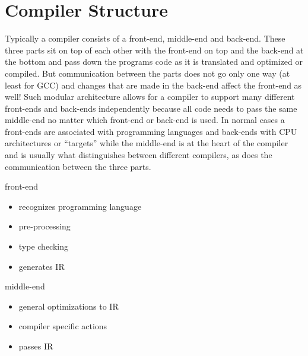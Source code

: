 \chapter{Compiler Structure}
\label{chapter:compiler structure}
Typically a compiler consists of a front-end, middle-end and back-end. These three parts sit on top of each other with the front-end on top and the back-end at the bottom and pass down the programs code as it is translated and optimized or compiled. But communication between the parts does not go only one way (at least for GCC)
and changes that are made in the back-end affect the front-end as well!
Such modular architecture  allows for a compiler to support many different front-ends and back-ends independently because all code needs to pass the same middle-end no matter which front-end or back-end is used. In normal cases a front-ends are associated with programming languages and back-ends with CPU architectures or ``targets'' while the middle-end is at the heart of the compiler and is usually what distinguishes between different compilers, as does the communication between the three parts.
\smallskip
 \begin{myexampleblock}{front-end}
	\begin{itemize}
		\item recognizes programming language
		\item pre-processing
		\item type checking
		\item generates IR
	\end{itemize}
\end{myexampleblock}
\begin{myexampleblock}{middle-end}
	\begin{itemize}
		\item general optimizations to IR
		\item compiler specific actions
		\item passes IR
	\end{itemize}
\end{myexampleblock}
